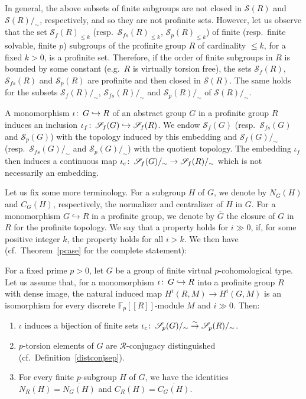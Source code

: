 \documentclass[12pt,twoside]{amsart}
\newcommand\F{{\mathbb F}}
\newcommand\cR{{\mathcal R}}
\newcommand\hookra{\hookrightarrow}
\newcommand\sr{\stackrel}
\newcommand\ol{\overline}
\newcommand\cS{{\mathscr S}}
\newcommand\wh{\widehat}
\def\co{\colon\thinspace}
\newenvironment{customtheorem}[1]
  {\renewcommand\theinnercustomthm{#1}\innercustomthm}
  {\endinnercustomthm}
\theoremstyle{definition}
\begin{document}
In general, the above subsets of finite subgroups are not closed in $\cS(R)$ and $\cS(R)/_{\sim}$, respectively, and so they are not profinite sets.
However, let us observe that the set $\cS_f(R)_{\leq k}$ (resp.\  $\cS_{f\!s}(R)_{\leq k}$, $\cS_p(R)_{\leq k}$) of finite 
(resp.\  finite solvable, finite $p$) subgroups of the profinite group $R$ of cardinality $\leq k$, for a fixed $k>0$, is a profinite set.  
Therefore, if the order of finite subgroups in $R$ is bounded by some constant (e.g.\ $R$ is virtually torsion free), the sets
$\cS_f(R)$, $\cS_{f\!s}(R)$ and $\cS_p(R)$ are profinite and then closed in $\cS(R)$. The same holds for 
the subsets $\cS_f(R)/_{\sim}$, $\cS_{f\!s}(R)/_{\sim}$ and $\cS_p(R)/_{\sim}$ of $\cS(R)/_{\sim}$.

A monomorphism $\iota\co G\hookra R$ of an abstract group $G$ in a profinite group $R$ induces an inclusion $\iota_f\co\cS_f(G)\hookra\cS_f(R)$. 
We endow $\cS_f(G)$ (resp.\ $\cS_{f\!s}(G)$ and $\cS_p(G)$) with the topology induced by this embedding and $\cS_f(G)/_{\sim}$ 
(resp.\ $\cS_{f\!s}(G)/_{\sim}$ and $\cS_p(G)/_{\sim}$) with the quotient topology. 
The embedding $\iota_f$ then induces a continuous map $\iota_c\co\cS_f(G)/_{\sim}\to\cS_f(R)/_{\sim}$ which is not necessarily an embedding.

Let us fix some more terminology.
For a subgroup $H$ of $G$, we denote by $N_G(H)$ and $C_G(H)$, respectively, the normalizer and centralizer of $H$ in $G$.
For a monomorphism $G\hookra R$ in a profinite group, we denote by $\ol{G}$ the closure of $G$ in $R$
for the profinite topology. We say that a property holds for $i\gg0$, if, for some positive integer $k$, the property holds for all $i>k$.
We then have (cf.\ Theorem~\ref{pcase} for the complete statement):

\begin{customtheorem}{A}For a fixed prime $p>0$, let $G$ be a group of finite virtual $p$-cohomological type. 
Let us assume that, for a monomorphism $\iota\co G\hookra R$ into a profinite group $R$ with dense image, 
the natural induced map $H^i(R,M)\to H^i(G, M)$ is an isomorphism for every discrete $\F_p[[R]]$-module $M$ and $i\gg0$. Then: 
\begin{enumerate}
\item $\iota$ induces a bijection of finite sets $\iota_c\co\cS_p(G)/_{\sim}\sr{\sim}{\to}\cS_p(R)/_{\sim}$. 
\item $p$-torsion elements of $G$ are $\cR$-conjugacy distinguished (cf.\ Definition~\ref{distconjsep}).
\item For every finite $p$-subgroup $H$ of $G$, we have the identities $N_{R}(H)=\ol{N_G(H)}$ and $C_{R}(H)=\ol{C_G(H)}$.
\end{enumerate}
\end{customtheorem}
\end{document}
